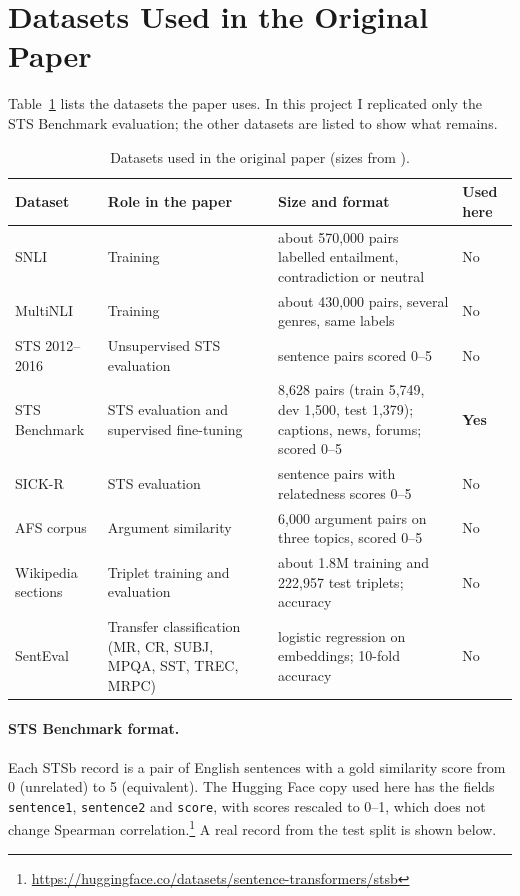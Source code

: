 \documentclass[11pt]{article}
\begin{document}
\section{Datasets Used in the Original Paper}
\label{sec:origdata}

Table~\ref{tab:origdata} lists the datasets the paper uses. In this project I replicated only the STS Benchmark evaluation; the other datasets are listed to show what remains.

\begin{table}[t]
\centering\small
\begin{tabular}{p{3.0cm}p{4.0cm}p{5.4cm}p{1.5cm}}
\toprule
Dataset & Role in the paper & Size and format & Used here \\
\midrule
SNLI \citep{bowman2015large} & Training & about 570,000 pairs labelled entailment, contradiction or neutral & No \\
MultiNLI \citep{williams2018broad} & Training & about 430,000 pairs, several genres, same labels & No \\
STS 2012--2016 \citep{agirre2012semeval,agirre2016semeval} & Unsupervised STS evaluation & sentence pairs scored 0--5 & No \\
STS Benchmark \citep{cer2017semeval} & STS evaluation and supervised fine-tuning & 8,628 pairs (train 5,749, dev 1,500, test 1,379); captions, news, forums; scored 0--5 & \textbf{Yes} \\
SICK-R \citep{marelli2014sick} & STS evaluation & sentence pairs with relatedness scores 0--5 & No \\
AFS corpus \citep{misra2016afs} & Argument similarity & 6,000 argument pairs on three topics, scored 0--5 & No \\
Wikipedia sections \citep{dor2018wikisections} & Triplet training and evaluation & about 1.8M training and 222,957 test triplets; accuracy & No \\
SentEval \citep{conneau2018senteval} & Transfer classification (MR, CR, SUBJ, MPQA, SST, TREC, MRPC) & logistic regression on embeddings; 10-fold accuracy & No \\
\bottomrule
\end{tabular}
\caption{Datasets used in the original paper (sizes from \citealp{reimers2019sentence}).}
\label{tab:origdata}
\end{table}

\paragraph{STS Benchmark format.}
Each STSb record is a pair of English sentences with a gold similarity score from 0 (unrelated) to 5 (equivalent). The Hugging Face copy used here has the fields \texttt{sentence1}, \texttt{sentence2} and \texttt{score}, with scores rescaled to 0--1, which does not change Spearman correlation.\footnote{\url{https://huggingface.co/datasets/sentence-transformers/stsb}} A real record from the test split is shown below.
\end{document}
